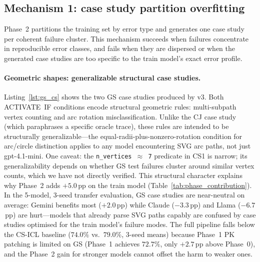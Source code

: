 \documentclass{article}
\begin{document}
\subsection{Mechanism 1: case study partition overfitting}
\label{sec:overfitting}

Phase~2 partitions the training set by error type and generates one case study per coherent
failure cluster.
This mechanism succeeds when failures concentrate in reproducible error classes, and fails when
they are dispersed or when the generated case studies are too specific to the train model's
exact error profile.

\paragraph{Geometric shapes: generalizable structural case studies.}
Listing~\ref{lst:gs_cs} shows the two GS case studies produced by v3.
Both ACTIVATE~IF conditions encode structural geometric rules: multi-subpath vertex counting
and arc rotation misclassification.
Unlike the CJ case study (which paraphrases a specific oracle trace), these rules are
intended to be structurally generalizable---the equal-radii-plus-nonzero-rotation condition
for arc/circle distinction applies to any model encountering SVG arc paths, not just gpt-4.1-mini.
One caveat: the \texttt{n\_vertices $\approx$ 7} predicate in CS1 is narrow;
its generalizability depends on whether GS test failures cluster around similar vertex counts,
which we have not directly verified.
This structural character explains why Phase~2 adds $+5.0$\,pp on the train model
(Table~\ref{tab:phase_contribution}).
In the 5-model, 3-seed transfer evaluation, GS case studies are near-neutral on average:
Gemini benefits most ($+2.0$\,pp) while Claude ($-3.3$\,pp) and Llama ($-6.7$\,pp) are
hurt---models that already parse SVG paths capably are confused by case studies optimised
for the train model's failure modes.
The full pipeline falls below the CS-ICL baseline ($74.0\%$ vs.\ $79.0\%$, 3-seed means)
because Phase~1 PK patching is limited on GS (Phase~1 achieves $72.7\%$, only $+2.7$\,pp
above Phase~0), and the Phase~2 gain for stronger models cannot offset the harm to weaker ones.
\end{document}
